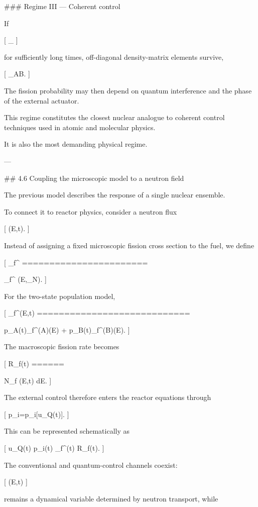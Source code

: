 ### Regime III — Coherent control

If

[
\Omega
\gtrsim
\Gamma_{}
]

for sufficiently long times, off-diagonal density-matrix elements survive,

[
\rho_{AB}.
]

The fission probability may then depend on quantum interference and the phase of the external actuator.

This regime constitutes the closest nuclear analogue to coherent control techniques used in atomic and molecular physics.

It is also the most demanding physical regime.

---

## 4.6 Coupling the microscopic model to a neutron field

The previous model describes the response of a single nuclear ensemble.

To connect it to reactor physics, consider a neutron flux

[
\Phi(E,t).
]

Instead of assigning a fixed microscopic fission cross section to the fuel, we define

[
\sigma_f^{}
=======================

\sigma_f^{}
(E,\rho_N).
]

For the two-state population model,

[
\sigma_f^{}(E,t)
============================

p_A(t)\sigma_f^{(A)}(E)
+
p_B(t)\sigma_f^{(B)}(E).
]

The macroscopic fission rate becomes

[
R_f(t)
======

N_f
\int
\Phi(E,t)
dE.
]

The external control therefore enters the reactor equations through

[
p_i=p_i[u_Q(t)].
]

This can be represented schematically as

[
u_Q(t)
\rightarrow
p_i(t)
\rightarrow
\sigma_f^{}(t)
\rightarrow
R_f(t).
]

The conventional and quantum-control channels coexist:

[
\Phi(E,t)
]

remains a dynamical variable determined by neutron transport, while

